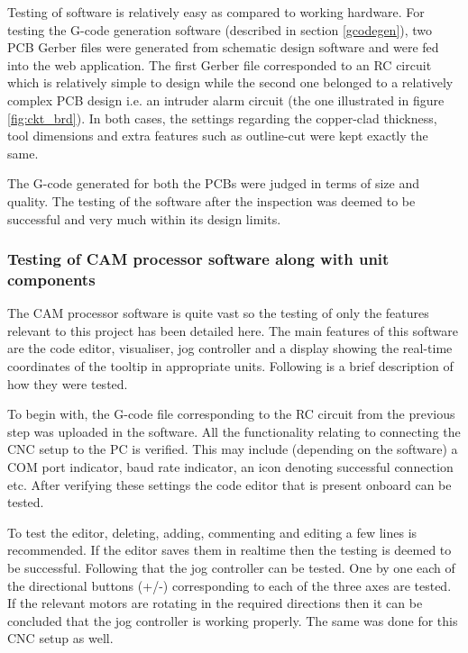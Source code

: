 Testing of software is relatively easy as compared to working hardware. For testing the G-code generation software (described in section \ref{gcodegen}), two PCB Gerber files were generated from schematic design software and were fed into the web application. The first Gerber file corresponded to an RC circuit which is relatively simple to design while the second one belonged to a relatively complex PCB design i.e. an intruder alarm circuit (the one illustrated in figure \ref{fig:ckt_brd}). In both cases, the settings regarding the copper-clad thickness, tool dimensions and extra features such as outline-cut were kept exactly the same. \par

The G-code generated for both the PCBs were judged in terms of size and quality. The testing of the software after the inspection was deemed to be successful and very much within its design limits.

\subsubsection*{Testing of CAM processor software along with unit components}

The CAM processor software is quite vast so the testing of only the features relevant to this project has been detailed here. The main features of this software are the code editor, visualiser, jog controller and a display showing the real-time coordinates of the tooltip in appropriate units. Following is a brief description of how they were tested. \par

To begin with, the G-code file corresponding to the RC circuit from the previous step was uploaded in the software. All the functionality relating to connecting the CNC setup to the PC is verified. This may include (depending on the software) a COM port indicator, baud rate indicator, an icon denoting successful connection etc. After verifying these settings the code editor that is present onboard can be tested. \par

To test the editor, deleting, adding, commenting and editing a few lines is recommended. If the editor saves them in realtime then the testing is deemed to be successful. Following that the jog controller can be tested. One by one each of the directional buttons (+/-) corresponding to each of the three axes are tested. If the relevant motors are rotating in the required directions then it can be concluded that the jog controller is working properly. The same was done for this CNC setup as well. \par

